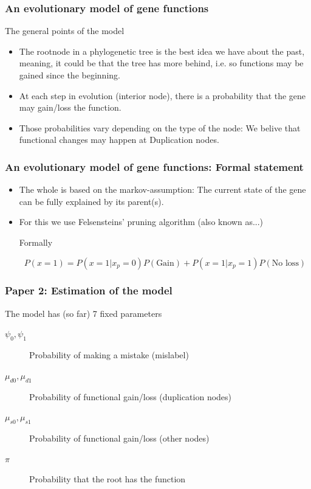 \documentclass[aspectratio=169, 10pt]{beamer}\usepackage[]{graphicx}\usepackage[]{color}
\begin{document}
\begin{frame}
\frametitle{An evolutionary model of gene functions}

The general points of the model
\begin{itemize}[<+->]
\item The rootnode in a phylogenetic tree is the best idea we have about the past, meaning,
it could be that the tree has more behind, i.e. so functions may be gained since the beginning.
\item At each step in evolution (interior node), there is a probability that the gene may
gain/loss the function.
\item Those probabilities vary depending on the type of the node: We belive that functional
changes may happen at Duplication nodes.
\end{itemize}
\end{frame}

\begin{frame}
\frametitle{An evolutionary model of gene functions: Formal statement}

\begin{itemize}[<+->]
\item The whole is based on the markov-assumption: The current state of the gene can be
fully explained by its parent(s).

\item For this we use Felsensteins' pruning algorithm (also known as...)

Formally

$$
P(x = 1) = P(x = 1| x_p = 0)P(\mbox{Gain}) + P(x = 1| x_p = 1)P(\mbox{No loss})
$$
\end{itemize}

\end{frame}

\begin{frame}
\frametitle{Paper 2: Estimation of the model}
The model has (so far) 7 fixed parameters
\begin{description}
\item[$\psi_0, \psi_1$] Probability of making a mistake (mislabel)
\item[$\mu_{d0}, \mu_{d1}$] Probability of functional gain/loss (duplication nodes)
\item[$\mu_{s0}, \mu_{s1}$] Probability of functional gain/loss (other nodes)
\item[$\pi$] Probability that the root has the function
\end{description}
\end{frame}
\end{document}

